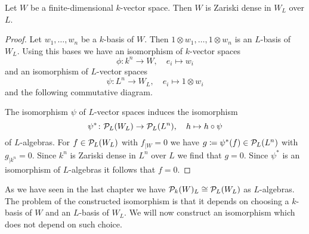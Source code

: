 \begin{lemma}\label{lemma: W Zariski dense in W_L}
  Let $W$ be a finite-dimensional $k$-vector space.
  Then $W$ is Zariski dense in $W_L$ over $L$.
\end{lemma}
\begin{proof}
  Let $w_1, \dotsc, w_n$ be a $k$-basis of $W$.
  Then $1 \otimes w_1, \dotsc, 1 \otimes w_n$ is an $L$-basis of $W_L$.
  Using this bases we have an isomorphism of $k$-vector spaces
  \[
            \phi
    \colon  k^n \to W,
    \quad   e_i
    \mapsto w_i
  \]
  and an isomorphism of $L$-vector spaces
  \[
            \psi
    \colon  L^n
    \to     W_L,
    \quad   e_i
    \mapsto 1 \otimes w_i
  \]
  and the following commutative diagram.
  \begin{center}
  \end{center}
  The isomorphism $\psi$ of $L$-vector spaces induces the isomorphism
  \[
            \psi^*
    \colon  \mathcal{P}_L(W_L)
    \to     \mathcal{P}_L(L^n),
    \quad   h
    \mapsto h \circ \psi
  \]
  of $L$-algebras.
  For $f \in \mathcal{P}_L(W_L)$ with $f_{|W} = 0$ we have $g \coloneqq \psi^*(f) \in \mathcal{P}_L(L^n)$ with $g_{|k^n} = 0$.
  Since $k^n$ is Zariski dense in $L^n$ over $L$ we find that $g = 0$.
  Since $\psi^*$ is an isomorphism of $L$-algebras it follows that $f = 0$.
\end{proof}


As we have seen in the last chapter we have $\mathcal{P}_k(W)_L \cong \mathcal{P}_L(W_L)$ as $L$-algebras.
The problem of the constructed isomorphism is that it depends on choosing a $k$-basis of $W$ and an $L$-basis of $W_L$.
We will now construct an isomorphism which does not depend on such choice.


